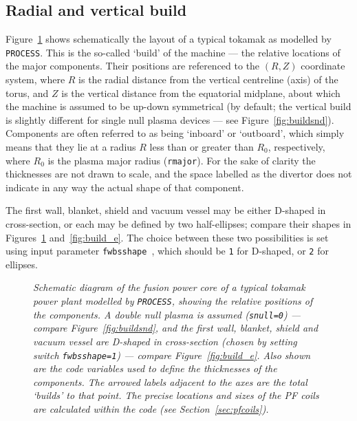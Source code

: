 \documentclass[11pt,a4paper]{report}
\newcommand{\process}{\mbox{\texttt{PROCESS}}}
\begin{document}
\subsection{Radial and vertical build}

Figure~\ref{fig:build_d} shows schematically the layout of a typical tokamak
as modelled by \process. This is the so-called `build' of the machine --- the
relative locations of the major components. Their positions are referenced to
the $(R,Z)$ coordinate system, where $R$ is the radial distance from the
vertical centreline (axis) of the torus, and $Z$ is the vertical distance from
the equatorial midplane, about which the machine is assumed to be up-down
symmetrical (by default; the vertical build is slightly different for single
null plasma devices --- see Figure~\ref{fig:buildsnd}). Components are often
referred to as being `inboard' or `outboard', which simply means that they lie
at a radius $R$ less than or greater than $R_0$, respectively, where $R_0$ is
the plasma major radius (\texttt{rmajor}). For the sake of clarity the
thicknesses are not drawn to scale, and the space labelled as the divertor
does not indicate in any way the actual shape of that component.

The first wall, blanket, shield and vacuum vessel may be either D-shaped in
cross-section, or each may be defined by two half-ellipses; compare their
shapes in Figures~\ref{fig:build_d} and~\ref{fig:build_e}. The choice between
these two possibilities is set using input parameter
\texttt{fwbsshape}~\cite{fwbsshape}, which should be \texttt{1} for D-shaped,
or \texttt{2} for ellipses.

\begin{figure}[tbph]
\caption[Machine build for D-shaped major components]
{\label{fig:build_d} \textit{Schematic diagram of the fusion
    power core of a typical tokamak power plant modelled by \process, showing
    the relative positions of the components. A double null plasma is assumed
    (\texttt{snull=0}) --- compare Figure~\ref{fig:buildsnd}, and the first
    wall, blanket, shield and vacuum vessel are D-shaped in cross-section
    (chosen by setting switch \texttt{fwbsshape=1}) --- compare
    Figure~\ref{fig:build_e}. Also shown are the code variables used to define
    the thicknesses of the components. The arrowed labels adjacent to the axes
    are the total `builds' to that point. The precise locations and sizes of
    the PF coils are calculated within the code (see
    Section~\ref{sec:pfcoils}).}  }
\end{figure}
\end{document}

